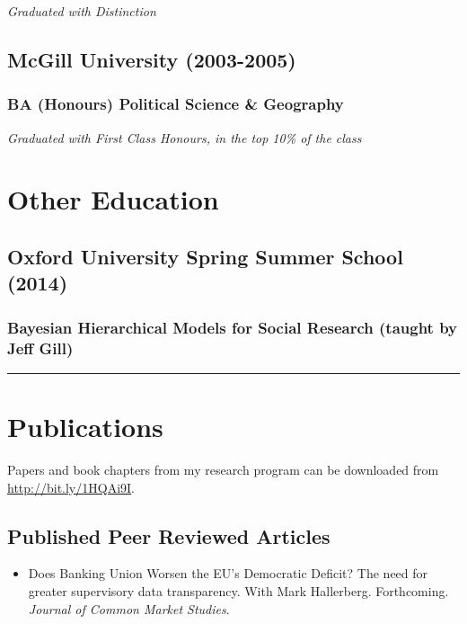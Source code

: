 \documentclass[a4paper]{article}
\begin{document}
{{{\emph{Graduated with Distinction}}

\subsection*{McGill University (2003-2005)}
\subsubsection*{BA (Honours) Political Science \& Geography}

{\emph{Graduated with First Class Honours, in the top 10\% of the class}}

\section*{Other Education}

\subsection*{Oxford University Spring Summer School (2014)}

\subsubsection*{Bayesian Hierarchical Models for Social Research (taught by Jeff Gill)}

\vspace{0.25cm}
\medskip\hrule height 1pt
\vspace{0.5cm}


\section*{Publications}

\noindent Papers and book chapters from my research program can be downloaded from {\url{http://bit.ly/1HQAi9I}}.

\subsection*{Published Peer Reviewed Articles}

\begin{itemize}

    \item Does Banking Union Worsen the EU's Democratic Deficit? The need for greater supervisory data transparency. With Mark Hallerberg. Forthcoming. {\emph{Journal of Common Market Studies}}.


\end{itemize}}}
\end{document}
